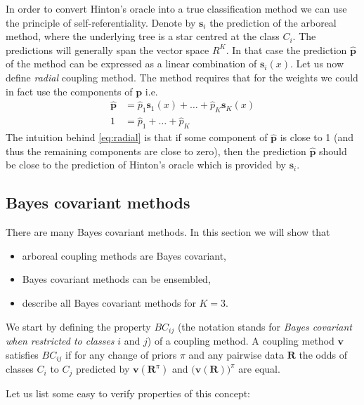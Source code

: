 \documentclass[twoside,11pt]{article}
\begin{document}
In order to convert Hinton's oracle into a true classification method we can use the principle of self-referentiality.  Denote by $\boldsymbol{s}_i$ the prediction of the arboreal method, where the underlying tree is a star centred at the class $C_i$. The predictions will generally span the vector space $R^K$. In that case the prediction $\hat{\boldsymbol{p}}$ of the method  can be expressed as a linear combination of $\boldsymbol{s}_i(x)$. Let us now define \emph{radial} coupling method. The  method requires that for the  weights we could in fact use the components of $\boldsymbol{p}$ i.e.
\begin{equation}
	\begin{split}
	\hat {\boldsymbol{p}} &= \hat p_1 \boldsymbol{s}_1(x) + \ldots + \hat p_K \boldsymbol{s}_K(x)\\
	1 &= \hat p_1 + \ldots + \hat p_K
	\end{split}
	 \label{eq:radial}
\end{equation}
%
The intuition behind \eqref{eq:radial} is that if some component of $\hat{\boldsymbol{p}}$ is close to 1 (and thus the remaining components are close to zero), then the prediction $\hat{\boldsymbol{p}}$ should be close to the prediction of Hinton's oracle which is provided by ${\boldsymbol{s}}_i$.

\subsection{Bayes covariant methods} \label{sec:bc2}

There are many Bayes covariant methods. In this section we will show that 
\begin{itemize} 
	\item arboreal coupling methods are Bayes covariant,
	\item Bayes covariant methods can be ensembled,
	\item describe all Bayes covariant methods for $K=3$.
\end{itemize}

We start by defining the property $BC_{ij}$ (the notation stands for \emph{Bayes covariant when restricted to classes} $i$ and $j$) of a coupling method. A coupling method $\boldsymbol{v}$ satisfies $BC_{ij}$ if for any change of priors $\pi$ and any  pairwise data $\boldsymbol{R}$ the odds of classes $C_i$ to $C_j$ predicted by $\boldsymbol{v}(\boldsymbol{R}^\pi)$ and $\bigl(\boldsymbol{v}(\boldsymbol{R})\bigr)^\pi$ are equal. 

Let us list some easy to verify properties of this concept:
\end{document}
